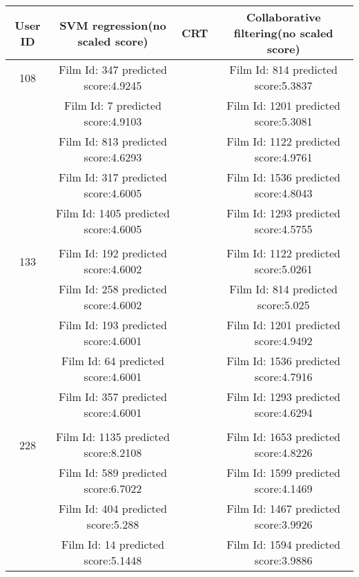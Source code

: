 \begin{longtable}{|c|c|c|c|}
\hline
{User ID} & {\bf SVM regression(no scaled score)} & {\bf CRT} & {\bf Collaborative filtering(no scaled score)} \\
\hline
\multicolumn{ 1}{|c|}{108} & Film Id: 347 predicted score:4.9245 &            & Film Id: 814 predicted score:5.3837 \\
\hline
\multicolumn{ 1}{|c|}{} & Film Id: 7 predicted score:4.9103 &            & Film Id: 1201 predicted score:5.3081 \\
\hline
\multicolumn{ 1}{|c|}{} & Film Id: 813 predicted score:4.6293 &            & Film Id: 1122 predicted score:4.9761 \\
\hline
\multicolumn{ 1}{|c|}{} & Film Id: 317 predicted score:4.6005 &            & Film Id: 1536 predicted score:4.8043 \\
\hline
\multicolumn{ 1}{|c|}{} & Film Id: 1405 predicted score:4.6005 &            & Film Id: 1293 predicted score:4.5755 \\
\hline
           &            &            &            \\
\hline
\multicolumn{ 1}{|c|}{133} & Film Id: 192 predicted score:4.6002 &            & Film Id: 1122 predicted score:5.0261 \\
\hline
\multicolumn{ 1}{|c|}{} & Film Id: 258 predicted score:4.6002 &            & Film Id: 814 predicted score:5.025 \\
\hline
\multicolumn{ 1}{|c|}{} & Film Id: 193 predicted score:4.6001 &            & Film Id: 1201 predicted score:4.9492 \\
\hline
\multicolumn{ 1}{|c|}{} & Film Id: 64 predicted score:4.6001 &            & Film Id: 1536 predicted score:4.7916 \\
\hline
\multicolumn{ 1}{|c|}{} & Film Id: 357 predicted score:4.6001 &            & Film Id: 1293 predicted score:4.6294 \\
\hline
           &            &            &            \\
\hline
\multicolumn{ 1}{|c|}{228} & Film Id: 1135 predicted score:8.2108 &            & Film Id: 1653 predicted score:4.8226 \\
\hline
\multicolumn{ 1}{|c|}{} & Film Id: 589 predicted score:6.7022 &            & Film Id: 1599 predicted score:4.1469 \\
\hline
\multicolumn{ 1}{|c|}{} & Film Id: 404 predicted score:5.288 &            & Film Id: 1467 predicted score:3.9926 \\
\hline
\multicolumn{ 1}{|c|}{} & Film Id: 14 predicted score:5.1448 &            & Film Id: 1594 predicted score:3.9886 \\

\end{longtable}
